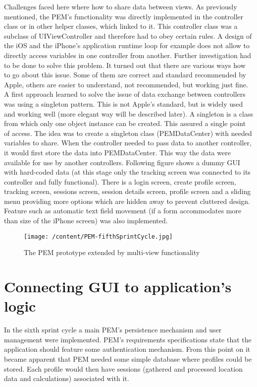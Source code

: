 \documentclass[12pt, a4paper]{report}   %
\begin{document}
\begin{enumerate}
Challenges faced here where how to share data between views. As previously mentioned, the PEM's functionality was directly implemented in the controller class or in other helper classes, which linked to it. This controller class was a subclass of UIViewController and therefore had to obey certain rules. A design of the iOS and the iPhone's application runtime loop for example does not allow to directly access variables in one controller from another. Further investigation had to be done to solve this problem. It turned out that there are various ways how to go about this issue. Some of them are correct and standard recommended by Apple, others are easier to understand, not recommended, but working just fine. A first approach learned to solve the issue of data exchange between controllers was using a singleton pattern. This is not Apple's standard, but is widely used and working well (more elegant way will be described later). A singleton is a class from which only one object instance can be created. This assured a single point of access. The idea was to create a singleton class (PEMDataCenter) with needed variables to share. When the controller needed to pass data to another controller, it would first store the data into PEMDataCenter. This way the data were available for use by another controllers. Following figure shows a dummy GUI with hard-coded data (at this stage only the tracking screen was connected to its controller and fully functional). There is a login screen, create profile screen, tracking screen, sessions screen, session details screen, profile screen and a sliding menu providing more options which are hidden away to prevent cluttered design. Feature such as automatic text field movement (if a form accommodates more than size of the iPhone screen) was also implemented.


\begin{figure}[H]
  \centering
	\texttt{[image: /content/PEM-fifthSprintCycle.jpg]}
	  \caption{The PEM prototype extended by multi-view functionality}
\end{figure}


\clearpage
\section{Connecting GUI to application's logic}
In the sixth sprint cycle a main PEM's persistence mechanism and user management were implemented. PEM's requirements specifications state that the application should feature some authentication mechanism. From this point on it became apparent that PEM needed some simple database where profiles could be stored. Each profile would then have sessions (gathered and processed location data and calculations) associated with it.



\end{enumerate}
\end{document}
